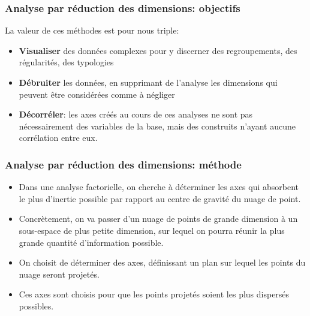 \documentclass{beamer}
\begin{document}
\begin{frame}[fragile]
\frametitle{Analyse par réduction des dimensions: objectifs}

La valeur de ces méthodes est pour nous triple:

\begin{itemize}
\item \textbf{Visualiser} des données complexes pour y discerner des regroupements, des régularités, des typologies
\item \textbf{Débruiter} les données, en supprimant de l'analyse les dimensions qui peuvent être considérées comme à négliger
\item \textbf{Décorréler}: les axes créés au cours de ces analyses ne sont pas nécessairement des variables de la base, mais des construits n'ayant aucune corrélation entre eux.
\end{itemize}

\end{frame}

\begin{frame}[fragile]
\frametitle{Analyse par réduction des dimensions: méthode}



\begin{itemize}
\item Dans une analyse factorielle, on cherche à déterminer les axes qui absorbent le plus d’inertie possible par rapport au centre de gravité du nuage de point.
\item Concrètement, on va passer d'un nuage de points de grande dimension à un sous-espace de plus petite dimension, sur lequel on pourra réunir la plus grande quantité d'information possible. 
\item On choisit de déterminer des axes, définissant un plan sur lequel les points du nuage seront projetés. 
\item Ces axes sont choisis pour que les points projetés soient les plus dispersés possibles.
\end{itemize}
\end{frame}
\end{document}
